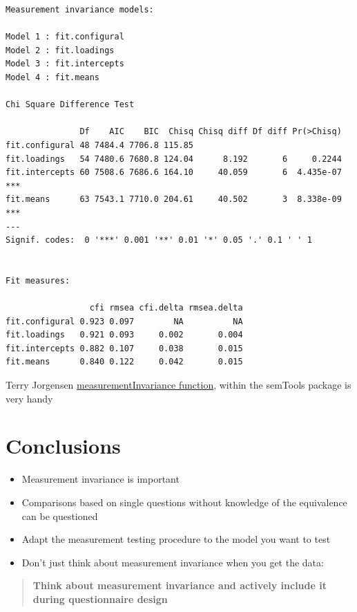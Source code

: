 \documentclass[
]{book}
\begin{document}
\begin{verbatim}
Measurement invariance models:

Model 1 : fit.configural
Model 2 : fit.loadings
Model 3 : fit.intercepts
Model 4 : fit.means

Chi Square Difference Test

               Df    AIC    BIC  Chisq Chisq diff Df diff Pr(>Chisq)    
fit.configural 48 7484.4 7706.8 115.85                                  
fit.loadings   54 7480.6 7680.8 124.04      8.192       6     0.2244    
fit.intercepts 60 7508.6 7686.6 164.10     40.059       6  4.435e-07 ***
fit.means      63 7543.1 7710.0 204.61     40.502       3  8.338e-09 ***
---
Signif. codes:  0 '***' 0.001 '**' 0.01 '*' 0.05 '.' 0.1 ' ' 1


Fit measures:

                 cfi rmsea cfi.delta rmsea.delta
fit.configural 0.923 0.097        NA          NA
fit.loadings   0.921 0.093     0.002       0.004
fit.intercepts 0.882 0.107     0.038       0.015
fit.means      0.840 0.122     0.042       0.015
\end{verbatim}

Terry Jorgensen \href{https://www.rdocumentation.org/packages/semTools/versions/0.4-14/topics/measurementInvariance}{measurementInvariance function}, within the semTools package is very handy

\hypertarget{conclusions}{%
\chapter{Conclusions}\label{conclusions}}

\begin{itemize}
\item
  Measurement invariance is important
\item
  Comparisons based on single questions without knowledge of the equivalence can be questioned
\item
  Adapt the measurement testing procedure to the model you want to test
\item
  Don't just think about measurement invariance when you get the data:
\end{itemize}

\begin{quote}
\textbf{Think about measurement invariance and actively include it during questionnaire design}
\end{quote}
\end{document}
